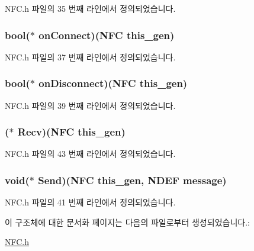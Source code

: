 N\-F\-C.\-h 파일의 35 번째 라인에서 정의되었습니다.

\hypertarget{struct__nfc_a070219e871b65c63119b2b9fcf2f7e40}{
\subsubsection[{on\-Connect}]{\setlength{\rightskip}{0pt plus 5cm}bool($\ast$  on\-Connect)({\bf N\-F\-C} this\-\_\-gen)}}\label{struct__nfc_a070219e871b65c63119b2b9fcf2f7e40}


N\-F\-C.\-h 파일의 37 번째 라인에서 정의되었습니다.

\hypertarget{struct__nfc_a3c638b599b78d063fd8472ea015597e0}{
\subsubsection[{on\-Disconnect}]{\setlength{\rightskip}{0pt plus 5cm}bool($\ast$  on\-Disconnect)({\bf N\-F\-C} this\-\_\-gen)}}\label{struct__nfc_a3c638b599b78d063fd8472ea015597e0}


N\-F\-C.\-h 파일의 39 번째 라인에서 정의되었습니다.

\hypertarget{struct__nfc_a2c24741e6d306b941e4b30559e5b7a52}{
\subsubsection[{Recv}]{($\ast$  Recv)({\bf N\-F\-C} this\-\_\-gen)}}\label{struct__nfc_a2c24741e6d306b941e4b30559e5b7a52}


N\-F\-C.\-h 파일의 43 번째 라인에서 정의되었습니다.

\hypertarget{struct__nfc_aca64adb6ba471126be23b84178dbd887}{
\subsubsection[{Send}]{\setlength{\rightskip}{0pt plus 5cm}void($\ast$  Send)({\bf N\-F\-C} this\-\_\-gen, {\bf N\-D\-E\-F} message)}}\label{struct__nfc_aca64adb6ba471126be23b84178dbd887}


N\-F\-C.\-h 파일의 41 번째 라인에서 정의되었습니다.



이 구조체에 대한 문서화 페이지는 다음의 파일로부터 생성되었습니다.\-:\begin{DoxyCompactItemize}
\item 
\hyperlink{_n_f_c_8h}{N\-F\-C.\-h}\end{DoxyCompactItemize}
